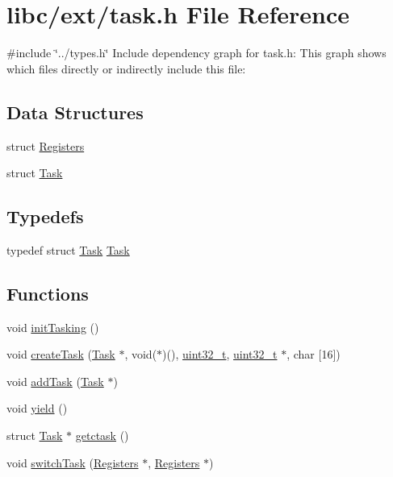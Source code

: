 \hypertarget{a00056}{}\section{libc/ext/task.h File Reference}
\label{a00056}
{\ttfamily \#include \char`\"{}../types.\+h\char`\"{}}\newline
Include dependency graph for task.\+h\+:
This graph shows which files directly or indirectly include this file\+:
\subsection*{Data Structures}
\begin{DoxyCompactItemize}
\item 
struct \hyperlink{a00138}{Registers}
\item 
struct \hyperlink{a00142}{Task}
\end{DoxyCompactItemize}
\subsection*{Typedefs}
\begin{DoxyCompactItemize}
\item 
typedef struct \hyperlink{a00142}{Task} \hyperlink{a00056_a7a90fbdcc84682f027affec67944111b_a7a90fbdcc84682f027affec67944111b}{Task}
\end{DoxyCompactItemize}
\subsection*{Functions}
\begin{DoxyCompactItemize}
\item 
void \hyperlink{a00056_aea945e91746a54801f4763ad264746b9_aea945e91746a54801f4763ad264746b9}{init\+Tasking} ()
\item 
void \hyperlink{a00056_a3abb1d0cc6fd9ea5a5b860f36bc81d6a_a3abb1d0cc6fd9ea5a5b860f36bc81d6a}{create\+Task} (\hyperlink{a00142}{Task} $\ast$, void($\ast$)(), \hyperlink{a00101_a435d1572bf3f880d55459d9805097f62_a435d1572bf3f880d55459d9805097f62}{uint32\+\_\+t}, \hyperlink{a00101_a435d1572bf3f880d55459d9805097f62_a435d1572bf3f880d55459d9805097f62}{uint32\+\_\+t} $\ast$, char \mbox{[}16\mbox{]})
\item 
void \hyperlink{a00056_a077ea59d35297d9fb3fa4675beefbd79_a077ea59d35297d9fb3fa4675beefbd79}{add\+Task} (\hyperlink{a00142}{Task} $\ast$)
\item 
void \hyperlink{a00056_a58c8b2ad0ea491a6642e5e1cbd358c89_a58c8b2ad0ea491a6642e5e1cbd358c89}{yield} ()
\item 
struct \hyperlink{a00142}{Task} $\ast$ \hyperlink{a00056_a5913e9b2190b2b4118ee020721a320e2_a5913e9b2190b2b4118ee020721a320e2}{getctask} ()
\item 
void \hyperlink{a00056_a2425ca34147fccde2d1503332d21c5bd_a2425ca34147fccde2d1503332d21c5bd}{switch\+Task} (\hyperlink{a00138}{Registers} $\ast$, \hyperlink{a00138}{Registers} $\ast$)
\end{DoxyCompactItemize}


